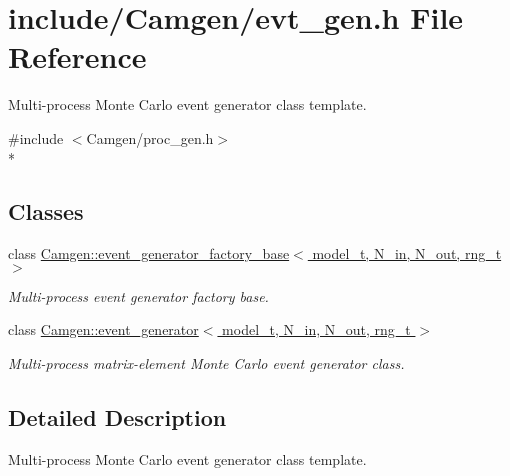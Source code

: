 \hypertarget{a00634}{}\section{include/\+Camgen/evt\+\_\+gen.h File Reference}
\label{a00634}


Multi-\/process Monte Carlo event generator class template.  


{\ttfamily \#include $<$Camgen/proc\+\_\+gen.\+h$>$}\\*
\subsection*{Classes}
\begin{DoxyCompactItemize}
\item 
class \hyperlink{a00214}{Camgen\+::event\+\_\+generator\+\_\+factory\+\_\+base$<$ model\+\_\+t, N\+\_\+in, N\+\_\+out, rng\+\_\+t $>$}
\begin{DoxyCompactList}\small\item\em Multi-\/process event generator factory base. \end{DoxyCompactList}\item 
class \hyperlink{a00212}{Camgen\+::event\+\_\+generator$<$ model\+\_\+t, N\+\_\+in, N\+\_\+out, rng\+\_\+t $>$}
\begin{DoxyCompactList}\small\item\em Multi-\/process matrix-\/element Monte Carlo event generator class. \end{DoxyCompactList}\end{DoxyCompactItemize}


\subsection{Detailed Description}
Multi-\/process Monte Carlo event generator class template. 

